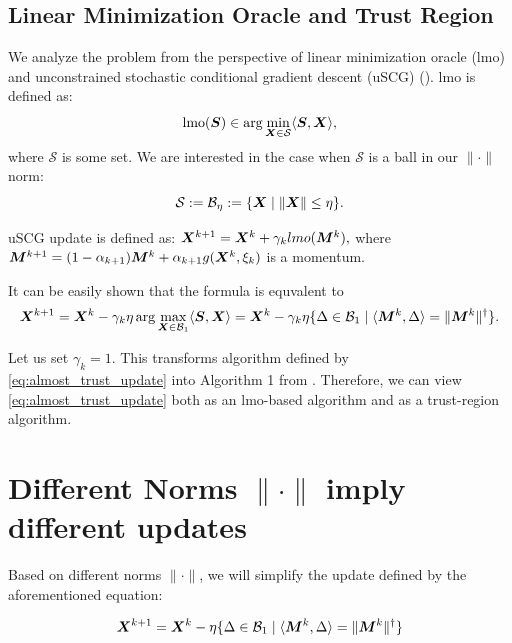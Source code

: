 \documentclass{article} %
\newcommand{\norm}[1]{\lVert #1\rVert}
\newcommand{\cB}{\mathcal{B}}
\newcommand{\cS}{\mathcal{S}}
\def\<#1,#2>{\langle #1,#2\rangle}
\begin{document}
\subsection{Linear Minimization Oracle and Trust Region}
    We analyze the problem from the perspective of linear minimization oracle (lmo) and unconstrained stochastic conditional gradient descent (uSCG) (\cite{pethick2025training}). lmo is defined as:
    \begin{equation}\label{eq:lmo}
        \mathrm{lmo}(\mS) \in \arg\min_{\mX \in \cS} \<\mS, \mX>,
    \end{equation}
    where $\cS$ is some set. We are interested in the case when $\cS$ is a ball in our $\norm{\cdot}$ norm:
    \begin{equation}\label{eq:ball}
        \cS := \cB_\eta :=\{ \mX \mid \norm{\mX} \leq \eta \}.
    \end{equation}

    uSCG update is defined as:
    ${\bm{X}}^{k+1} = {\bm{X}}^{k} + \gamma_k lmo({\bm{M}}^k),$ where ${\bm{M}}^{k+1} = (1-\alpha_{k+1}){\bm{M}}^{k} + \alpha_{k+1}g({\bm{X}}^k, \xi_k)$ is a momentum.

    It can be easily shown that the formula is equvalent to
    \begin{equation}\label{eq:almost_trust_update}
        \mX^{k+1} = \mX^{k} - \gamma_k\eta \arg\max_{\mX \in \cB_1} \<\mS, \mX> = \mX^{k} - \gamma_k\eta \{\Delta \in \cB_1 \mid \<\mM^k, \Delta> = \norm{\mM^k}^\dagger\}.
    \end{equation}

    Let us set $\gamma_k = 1$. This transforms algorithm defined by \cref{eq:almost_trust_update} into Algorithm 1 from \cite{kovalev2025understanding}. Therefore, we can view \cref{eq:almost_trust_update} both as an lmo-based algorithm and as a trust-region algorithm.

\section{Different Norms $\norm{\cdot}$ imply different updates}

    Based on different norms $\norm{\cdot}$, we will simplify the update defined by the aforementioned equation:

    \begin{equation}\label{eq:our_update}
        \mX^{k+1} = \mX^{k} - \eta \{\Delta \in \cB_1 \mid \<\mM^k, \Delta> = \norm{\mM^k}^\dagger\}
    \end{equation}
\end{document}
